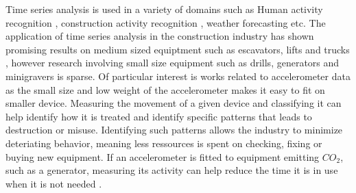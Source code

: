 Time series analysis is used in a variety of domains such as Human activity recognition \cite{HumanActivityrecognitionAccelerometer}, construction activity recognition \cite{ConstructionRecognitionFractionalRandomForest}\cite{timeseriesDataAugmentationConstruction}, weather forecasting \cite{weatherForecastTimeSeries} etc. 
The application of time series analysis in the construction industry has shown promising results on medium sized equiptment such as escavators, lifts and trucks \cite{timeseriesDataAugmentationConstruction, constructionRecognitionMobileSensors,ConstructionRecognitionFractionalRandomForest},  however research involving small size equipment such as drills, generators and minigravers is sparse. 
Of particular interest is works related to accelerometer data \cite{HumanActivityrecognitionAccelerometer,timeseriesDataAugmentationConstruction} as the small size and low weight of the accelerometer makes it easy to fit on smaller device. 
Measuring the movement of a given device and classifying it can help identify how it is treated and identify specific patterns that leads to destruction or misuse. 
Identifying such patterns allows the industry to minimize deteriating behavior, meaning less ressources is spent on checking, fixing or buying new equipment. 
If an accelerometer is fitted to equipment emitting $CO_2$, such as a generator, measuring its activity can help reduce the time it is in use when it is not needed .\\ 
